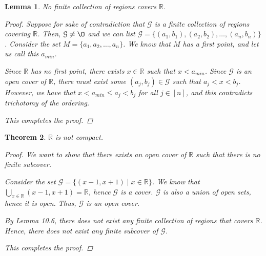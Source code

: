\documentclass[11pt]{article}
\newcommand{\bbR}{\mathbb{R}}
\renewcommand{\emptyset}{\O}
\renewcommand{\_}[1]{\underline{ #1 }}
\newtheorem{theorem}{Theorem}[section]
\newtheorem{lemma}[theorem]{Lemma}
\theoremstyle{definition}
\numberwithin{equation}{subsection}
\begin{document}
\begin{lemma}
No finite collection of regions covers $\bbR$.

\begin{proof}
Suppose for sake of contradiction that $\mathcal{G}$ is a finite collection of regions covering $\bbR$. Then, $\mathcal{G} \neq \emptyset$ and we can list $\mathcal{G} = \{(a_1,b_1),(a_2,b_2),\dots,(a_n,b_n)\}$. Consider the set $M = \{a_1,a_2,\dots,a_n\}$. We know that $M$ has a first point, and let us call this $a_{min}$.

Since $\bbR$ has no first point, there exists $x \in \bbR$ such that $x<a_{min}$. Since $\mathcal{G}$ is an open cover of $\bbR$, there must exist some $(a_j,b_j) \in \mathcal{G}$ such that $a_j<x<b_j$. However, we have that $x<a_{min}\leq a_j<b_j$ for all $j \in [n]$, and this contradicts trichotomy of the ordering.

This completes the proof.

\renewcommand\qedsymbol{QED}
\end{proof}



\end{lemma}

\begin{theorem}  
$\bbR$ is not compact.

\begin{proof}
We want to show that there exists an open cover of $\bbR$ such that there is no finite subcover.

Consider the set $\mathcal{G} = \{(x-1,x+1) \mid x \in \bbR\}$. We know that $\bigcup_{x \in \bbR} (x-1,x+1) = \bbR$, hence $\mathcal{G}$ is a cover. $\mathcal{G}$ is also a union of open sets, hence it is open. Thus, $\mathcal{G}$ is an open cover.

By Lemma 10.6, there does not exist any finite collection of regions that covers $\bbR$. Hence, there does not exist any finite subcover of $\mathcal{G}$.

This completes the proof.

\renewcommand\qedsymbol{QED}
\end{proof}


\end{theorem}
\end{document}
